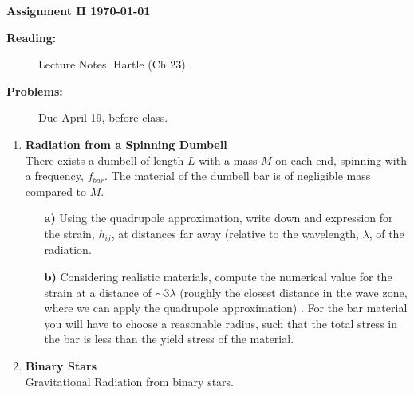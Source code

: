 \documentclass[11pt]{article}
\newcommand{\zach}[1]{\textcolor{ForestGreen}{#1}}
\begin{document}
%
\centerline{\large\bf  \hfill Assignment II \hfill  \today}

\medskip
\begin{description}
\item[{\bf Reading:}] Lecture Notes. Hartle (Ch 23). \\
\item[{\bf Problems:} \hfill ] Due April 19, before class.
\end{description}


\medskip

\begin{enumerate}

\item
{\bf Radiation from a Spinning Dumbell} \\
There exists a dumbell of length $L$ with a mass $M$ on each end,
spinning with a frequency, $f_{bar}$. The
material of the dumbell bar is of negligible mass compared to $M$.
\begin{itemize}

\item[\bf a)] Using the quadrupole approximation, write down and
  expression for the strain, $h_{ij}$, at distances far away (relative to the
  wavelength, $\lambda$, of the radiation.
  

\item[\bf b)] Considering realistic materials, compute the numerical
  value for the strain at a distance of $\sim 3 \lambda$ (roughly the closest distance in the wave zone, where we can apply the quadrupole approximation) . For the bar
  material you will have to choose a reasonable radius, such that the
  total stress in the bar is less than the yield stress of the
  material. 
  

\end{itemize}

\item
{\bf Binary Stars} \\
Gravitational Radiation from binary stars.
\begin{itemize}


\end{itemize}
\end{enumerate}
\end{document}

